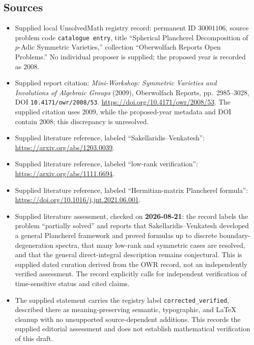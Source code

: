 \documentclass[11pt]{article}
\begin{document}
\subsection{Sources}
\begin{itemize}
\item Supplied local UnsolvedMath registry record: permanent ID \(30001106\), source problem code \texttt{catalogue entry}, title ``Spherical Plancherel Decomposition of \(p\)-Adic Symmetric Varieties,'' collection ``Oberwolfach Reports Open Problems.'' No individual proposer is supplied; the proposed year is recorded as 2008.
\item Supplied report citation: \emph{Mini-Workshop: Symmetric Varieties and Involutions of Algebraic Groups} (2009), Oberwolfach Reports, pp.\ 2985--3028, DOI \texttt{10.4171/owr/2008/53}. \url{https://doi.org/10.4171/owr/2008/53}. The supplied citation uses 2009, while the proposed-year metadata and DOI contain 2008; this discrepancy is unresolved.
\item Supplied literature reference, labeled ``Sakellaridis--Venkatesh'': \url{https://arxiv.org/abs/1203.0039}.
\item Supplied literature reference, labeled ``low-rank verification'': \url{https://arxiv.org/abs/1111.6694}.
\item Supplied literature reference, labeled ``Hermitian-matrix Plancherel formula'': \url{https://doi.org/10.1016/j.jnt.2021.06.001}.
\item Supplied literature assessment, checked on \textbf{2026-08-21}: the record labels the problem ``partially solved'' and reports that Sakellaridis--Venkatesh developed a general Plancherel framework and proved formulas up to discrete boundary-degeneration spectra, that many low-rank and symmetric cases are resolved, and that the general direct-integral description remains conjectural. This is supplied dated curation derived from the OWR record, not an independently verified assessment. The record explicitly calls for independent verification of time-sensitive status and cited claims.
\item The supplied statement carries the registry label \texttt{corrected\_verified}, described there as meaning-preserving semantic, typographic, and LaTeX cleanup with no unsupported source-dependent additions. This records the supplied editorial assessment and does not establish mathematical verification of this draft.
\end{itemize}
\end{document}
